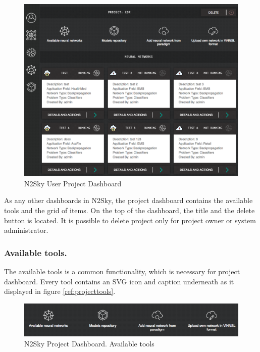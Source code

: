 \begin{figure}[htbp]
\begin{center}
  \includegraphics[width=\linewidth]{components/5/img/projects_dsahboard.png}
  \caption{N2Sky User Project Dashboard}
  \label{fig:projects_dsahboard}
\end{center}
\end{figure}

As any other dashboards in N2Sky, the project dashboard contains the available tools and the grid of items.
On the top of the dashboard, the title and the delete button is located. It is possible to delete project only for project owner or system administrator. 

\subsubsection{Available tools.} 

The available tools is a common functionality, which is necessary for project dashboard. Every tool contains an SVG icon and caption underneath as it displayed in figure \ref{ref:projecttools}. 

\begin{figure}[htbp]
\begin{center}
  \includegraphics[width=\linewidth]{components/5/img/project_tools.png}
  \caption{N2Sky Project Dashboard. Available tools}
  \label{fig:projecttools}
\end{center}
\end{figure}

